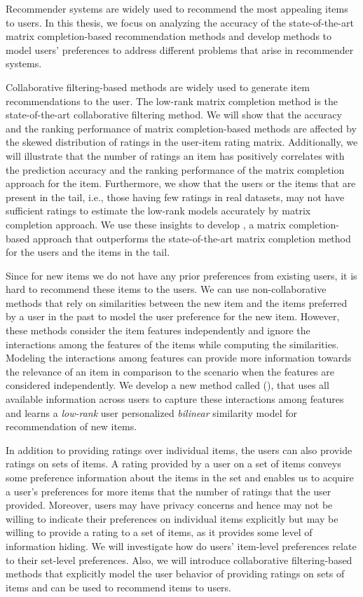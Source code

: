 Recommender systems are widely used to recommend the most appealing items to
users.
In this thesis, we focus on analyzing the accuracy of the state-of-the-art matrix
completion-based recommendation methods and develop methods to model users' 
preferences to address different problems that arise in recommender systems.
 
Collaborative filtering-based methods are widely used to generate item recommendations to the user. The low-rank matrix completion method is the state-of-the-art collaborative filtering method.  
We will show that the accuracy and the ranking performance of matrix completion-based
methods are affected by the skewed distribution of ratings in the user-item rating matrix.
Additionally, we will illustrate that the number of ratings an item has positively
correlates with the prediction accuracy and the ranking performance of the matrix
completion approach for the item.
Furthermore, we show that the users or the items that are present in the tail, i.e.,
those having few ratings in real datasets, may not have sufficient ratings to
estimate the low-rank models accurately by matrix completion approach. We use
these insights to develop \TMF, a matrix completion-based approach that outperforms
the state-of-the-art matrix completion method for the users and the items in the tail.


Since for new items we do not have any prior preferences from existing users, it is hard
to recommend these items to the users.  We can use non-collaborative methods that rely
on similarities between the new item and the items preferred by a user in the past to model the user preference for the new item.
However, these methods consider the item features independently and ignore the
interactions among the features of the items while computing the similarities. 
Modeling the interactions among features can provide more information towards the
relevance of an item in comparison to the scenario when the features are considered
independently.
We develop a new method called \CFEXP (\CF), that uses all available information
across users to capture these interactions among features and learns a \emph{low-rank}
user personalized \emph{bilinear} similarity model for \TOPN recommendation
of new items.


In addition to providing ratings over individual items, the users can also provide
ratings on sets of items. A rating provided by a user on a set of items conveys some
preference information about the items in the set and enables us to acquire a user's
preferences for more items that the number of ratings that the user provided. Moreover,
users may have privacy concerns and hence may not be willing to indicate their preferences
on individual items explicitly but may be willing to provide a rating to a set of items,
as it provides some level of information hiding.
We will investigate how do users' item-level preferences relate to their set-level preferences.
Also, we will introduce collaborative filtering-based methods
that explicitly model the user behavior of providing ratings on sets of items and can be
used to recommend items to users.






